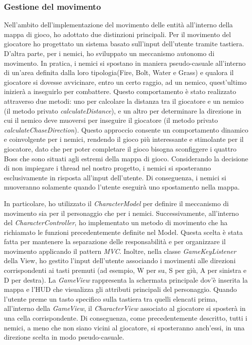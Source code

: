 \documentclass[a4paper,12pt]{report}
\begin{document}
\subsubsection{Gestione del movimento}
Nell'ambito dell'implementazione del movimento delle entità all'interno della mappa di gioco, ho adottato due distinzioni principali. Per il movimento del giocatore ho progettato un sistema basato sull'input dell'utente tramite tastiera. D'altra parte, per i nemici, ho sviluppato un meccanismo autonomo di movimento. In pratica, i nemici si spostano in maniera pseudo-casuale all'interno di un'area definita dalla loro tipologia(Fire, Bolt, Water e Grass) e qualora il giocatore si dovesse avvicinare, entro un certo raggio, ad un nemico, quest'ultimo inizierà a inseguirlo per combattere. Questo comportamento è stato realizzato attraverso due metodi: uno per calcolare la distanza tra il giocatore e un nemico (il metodo privato \textit{calculateDistance}), e un altro per determinare la direzione in cui il nemico deve muoversi per inseguire il giocatore (il metodo privato \textit{calculateChaseDirection}). Questo approccio consente un comportamento dinamico e coinvolgente per i nemici, rendendo il gioco più interessante e stimolante per il giocatore, dato che per poter completare il gioco bisogna sconfiggere i quattro Boss che sono situati agli estremi della mappa di gioco.
Considerando la decisione di non impiegare i thread nel nostro progetto, i nemici si sposteranno esclusivamente in risposta all'input dell'utente. Di conseguenza, i nemici si muoveranno solamente quando l'utente eseguirà uno spostamento nella mappa.

In particolare, ho utilizzato il \textit{CharacterModel} per definire il meccanismo di movimento sia per il personaggio che per i nemici. Successivamente, all'interno del \textit{CharacterController}, ho implementato un metodo di movimento che ha richiamato le funzioni precedentemente definite nel Model. Questa scelta è stata fatta per mantenere la separazione delle responsabilità e per organizzare il movimento applicando il pattern \textit{MVC}. Inoltre, nella classe \textit{GameKeyListener} della View, ho gestito l'input dell'utente associando i movimenti alle direzioni corrispondenti ai tasti premuti (ad esempio, W per su, S per giù, A per sinistra e D per	destra). La \textit{GameView} rappresenta la schermata principale dov'è inserita la mappa e l'HUD che visualizza gli attributi principali del personaggio.
Quando l'utente preme un tasto specifico sulla tastiera tra quelli elencati prima, all'interno della \textit{GameView}, il \textit{CharacterView} associato al giocatore si sposterà in una cella corrispondente. Di conseguenza, come precedentemente descritto, tutti i nemici, a meno che non siano vicini al giocatore, si sposteranno anch'essi, in una direzione scelta in modo pseudo-casuale.
\end{document}
